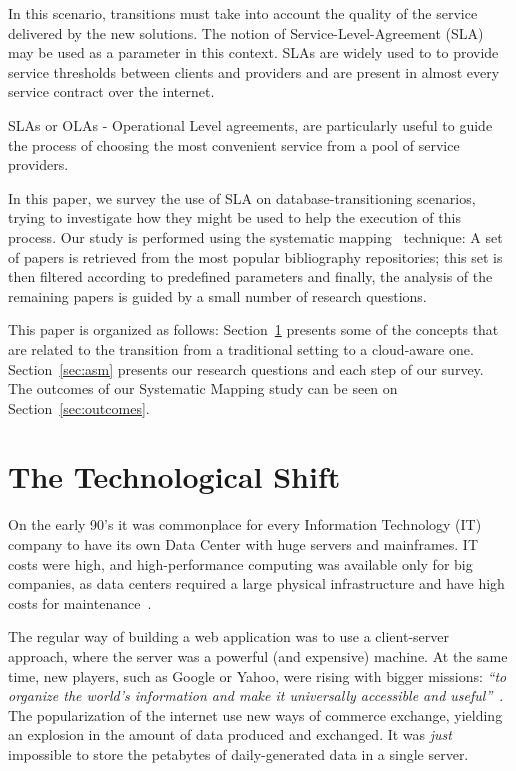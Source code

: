 \documentclass[conference, 10pt, a4paper]{IEEEtran}
\begin{document}
In this scenario, transitions must take into account the quality of the service delivered by the new solutions.
The notion of Service-Level-Agreement (SLA)~\cite{6253526} may be used as a parameter in this context. SLAs are widely used to to provide service thresholds between clients and providers and are present in almost every service contract over the internet. 

SLAs or OLAs - Operational Level agreements, are particularly useful to guide the process of choosing the most convenient service from a pool of service providers.

In this paper, we survey the use of SLA on database-transitioning scenarios, trying to investigate how they might be used to help the execution of this process.
Our study is performed using the systematic mapping~\cite{Petersen:2008:SMS:2227115.2227123} technique: A set of papers is retrieved from the most popular bibliography repositories; this set is then filtered according to predefined parameters and finally, the analysis of the remaining papers is guided by a small number of research questions.

\bigskip

This paper is organized as follows: 
Section~\ref{sec:tts} presents some of the concepts that are related to the transition from a traditional setting to a cloud-aware one.
Section~\ref{sec:asm} presents our research questions and each step of our survey. The outcomes of our Systematic Mapping study can be seen on Section~\ref{sec:outcomes}.

\section{The Technological Shift}
\label{sec:tts}


On the early 90's it was commonplace for every Information Technology (IT) company to have its own Data Center with huge servers and mainframes. 
IT costs were high, and high-performance computing was available only for big companies, as data centers required a large physical infrastructure and have high costs for maintenance~\cite{Armbrust09m.:above}.

The regular way of building a web application was to use a client-server approach, where the server was a powerful (and expensive) machine. 
At the same time, new players, such as Google or Yahoo, were rising with bigger missions: \textit{``to organize the world's information and make it universally accessible and useful''}~\cite{Spector:2012:GHA:2209249.2209262}. 
The popularization of the internet use new ways of commerce exchange, yielding an explosion in the amount of data produced and exchanged. 
It was \textit{just} impossible to store the petabytes of daily-generated data in a single server. 
\end{document}
